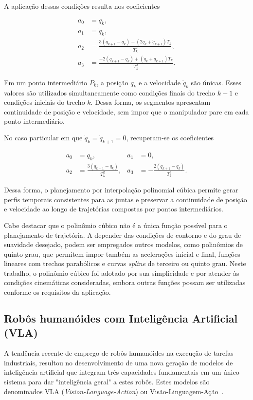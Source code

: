 A aplicação dessas condições resulta nos coeficientes

\begin{align}
a_0 &= q_k, \\
a_1 &= \dot{q}_k, \\
a_2 &= \frac{3(q_{k+1}-q_k)-(2\dot{q}_k+\dot{q}_{k+1})T_k}{T_k^2}, \\
a_3 &= \frac{-2(q_{k+1}-q_k)+(\dot{q}_k+\dot{q}_{k+1})T_k}{T_k^3}.
\end{align}

Em um ponto intermediário $P_k$, a posição $q_k$ e a velocidade $\dot{q}_k$ são únicas. Esses valores são utilizados simultaneamente como condições finais do trecho $k-1$ e condições iniciais do trecho $k$. Dessa forma, os segmentos apresentam continuidade de posição e velocidade, sem impor que o manipulador pare em cada ponto intermediário.

No caso particular em que $\dot{q}_k=\dot{q}_{k+1}=0$, recuperam-se os coeficientes

\begin{align}
a_0 &= q_k, & a_1 &= 0, \\
a_2 &= \frac{3(q_{k+1}-q_k)}{T_k^2}, &
a_3 &= -\frac{2(q_{k+1}-q_k)}{T_k^3}.
\end{align}

Dessa forma, o planejamento por interpolação polinomial cúbica permite gerar perfis temporais consistentes para as juntas e preservar a continuidade de posição e velocidade ao longo de trajetórias compostas por pontos intermediários.

Cabe destacar que o polinômio cúbico não é a única função possível para o planejamento de trajetória. A depender das condições de contorno e do grau de suavidade desejado, podem ser empregados outros modelos, como polinômios de quinto grau, que permitem impor também as acelerações inicial e final, funções lineares com trechos parabólicos e curvas \textit{spline} de terceiro ou quinto grau. Neste trabalho, o polinômio cúbico foi adotado por sua simplicidade e por atender às condições cinemáticas consideradas, embora outras funções possam ser utilizadas conforme os requisitos da aplicação.

\subsection {Robôs humanóides com Inteligência Artificial (VLA)}


A tendência recente de emprego de robôs humanóides na execução de tarefas industriais, resultou no desenvolvimento de uma nova geração de modelos de inteligência artificial que integram três capacidades fundamentais em um único sistema para dar "inteligência geral" a estes robôs. Estes modelos são denominados VLA (\textit{Vision-Language-Action}) ou Visão-Linguagem-Ação~\cite{rt2_2023,openvla_2024}.

